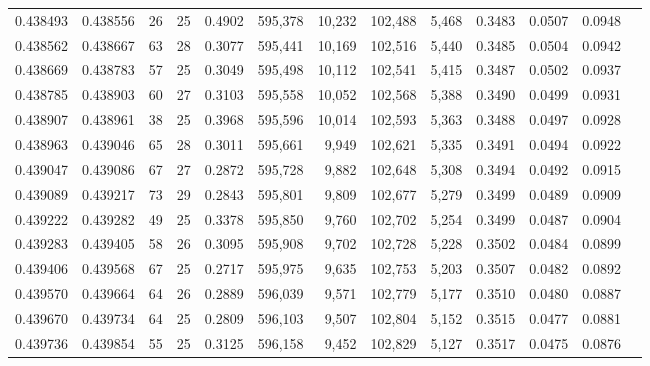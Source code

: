 \begin{tabular}{rrrrrrrrrrrrr}
0.438493 & 0.438556 &    26 &  25 &                                     0.4902 & 595,378 &  10,232 & 102,488 &   5,468 & 0.3483 & 0.0507 & 0.0948 \\
0.438562 & 0.438667 &    63 &  28 &                                     0.3077 & 595,441 &  10,169 & 102,516 &   5,440 & 0.3485 & 0.0504 & 0.0942 \\
0.438669 & 0.438783 &    57 &  25 &                                     0.3049 & 595,498 &  10,112 & 102,541 &   5,415 & 0.3487 & 0.0502 & 0.0937 \\
0.438785 & 0.438903 &    60 &  27 &                                     0.3103 & 595,558 &  10,052 & 102,568 &   5,388 & 0.3490 & 0.0499 & 0.0931 \\
0.438907 & 0.438961 &    38 &  25 &                                     0.3968 & 595,596 &  10,014 & 102,593 &   5,363 & 0.3488 & 0.0497 & 0.0928 \\
0.438963 & 0.439046 &    65 &  28 &                                     0.3011 & 595,661 &   9,949 & 102,621 &   5,335 & 0.3491 & 0.0494 & 0.0922 \\
0.439047 & 0.439086 &    67 &  27 &                                     0.2872 & 595,728 &   9,882 & 102,648 &   5,308 & 0.3494 & 0.0492 & 0.0915 \\
0.439089 & 0.439217 &    73 &  29 &                                     0.2843 & 595,801 &   9,809 & 102,677 &   5,279 & 0.3499 & 0.0489 & 0.0909 \\
0.439222 & 0.439282 &    49 &  25 &                                     0.3378 & 595,850 &   9,760 & 102,702 &   5,254 & 0.3499 & 0.0487 & 0.0904 \\
0.439283 & 0.439405 &    58 &  26 &                                     0.3095 & 595,908 &   9,702 & 102,728 &   5,228 & 0.3502 & 0.0484 & 0.0899 \\
0.439406 & 0.439568 &    67 &  25 &                                     0.2717 & 595,975 &   9,635 & 102,753 &   5,203 & 0.3507 & 0.0482 & 0.0892 \\
0.439570 & 0.439664 &    64 &  26 &                                     0.2889 & 596,039 &   9,571 & 102,779 &   5,177 & 0.3510 & 0.0480 & 0.0887 \\
0.439670 & 0.439734 &    64 &  25 &                                     0.2809 & 596,103 &   9,507 & 102,804 &   5,152 & 0.3515 & 0.0477 & 0.0881 \\
0.439736 & 0.439854 &    55 &  25 &                                     0.3125 & 596,158 &   9,452 & 102,829 &   5,127 & 0.3517 & 0.0475 & 0.0876 \\

\end{tabular}
